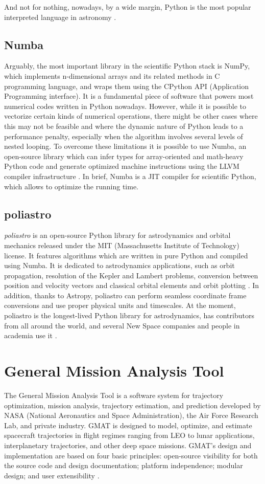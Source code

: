 And not for nothing, nowadays, by a wide margin, Python is the most popular interpreted language in astronomy
\cite{momcheva2015software}.

\subsection{Numba}
Arguably, the most important library in the scientific Python stack is NumPy, which implements n-dimensional arrays and its related methods in C programming language, and wraps them using the CPython API (Application Programming interface).
It is a fundamental piece of software that powers most numerical codes written in Python nowadays.
However, while it is possible to vectorize certain kinds of numerical operations, there might be other cases where this may not be feasible and where the dynamic nature of Python leads to a performance penalty, especially when the algorithm involves several levels of nested looping.
To overcome these limitations it is possible to use Numba, an open-source library which can infer types for array-oriented and math-heavy Python code and generate optimized machine instructions using the LLVM compiler infrastructure
\cite{rodriguez2016poliastro}.
In brief, Numba is a JIT compiler for scientific Python, which allows to optimize the running time.

\subsection{poliastro}
\textit{poliastro} is an open-source Python library for astrodynamics and orbital mechanics released under the MIT (Massachusetts Institute of Technology) license.
It features algorithms which are written in pure Python and compiled using Numba.
It is dedicated to astrodynamics applications, such as orbit propagation, resolution of the Kepler and Lambert problems, conversion between position and velocity vectors and classical orbital elements and orbit plotting
\cite{rodriguez2016poliastro}.
In addition, thanks to Astropy, poliastro can perform seamless coordinate frame conversions and use proper physical units and timescales.
At the moment, poliastro is the longest-lived Python library for astrodynamics, has contributors from all around the world, and several New Space companies and people in academia use it
\cite{rodriguez2022poliastro}.

\section{General Mission Analysis Tool}
The General Mission Analysis Tool is a software system for trajectory optimization, mission analysis, trajectory estimation, and prediction developed by NASA (National Aeronautics and Space Administration), the Air Force Research Lab, and private industry.
GMAT is designed to model, optimize, and estimate spacecraft trajectories in flight regimes ranging from LEO to lunar applications, interplanetary trajectories, and other deep space missions.
GMAT's design and implementation are based on four basic principles: open-source visibility for both the source code and design documentation; platform independence; modular design; and user extensibility
\cite{conway2010general}.


